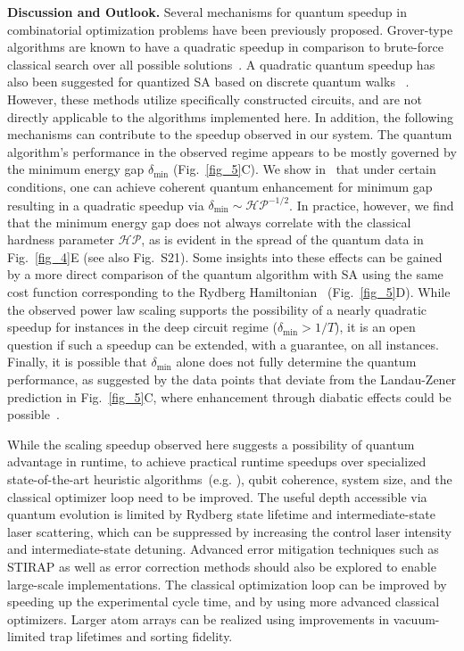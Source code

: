 \documentclass[twocolumn,amssymb,secnumarabic, prl, aps, nofootinbib]{revtex4-1}
\begin{document}
\noindent \textbf{Discussion and Outlook.}
Several mechanisms for quantum speedup in combinatorial optimization problems have been previously proposed. Grover-type algorithms are known to have a quadratic speedup in comparison to brute-force classical search over all possible solutions~\cite{grover_fast_1996, durr1999quantum}. 
A quadratic quantum speedup has also been suggested for quantized SA based on discrete quantum walks ~\cite{sze04, SBBK2008QSA}. However, these methods utilize specifically constructed circuits, and are not directly applicable to the algorithms implemented here. In addition, the following mechanisms can contribute to the speedup observed in our system. 
The quantum algorithm's performance in the observed regime appears to be mostly governed by the minimum energy gap $\delta_{\min}$ (Fig.~\ref{fig_5}C). We show in~\cite{SI} that under certain conditions, one can achieve coherent quantum enhancement for minimum gap resulting in a quadratic speedup via $\delta_{\min} \sim \mathcal{HP}^{-1/2}$. In practice, however,  we find that the minimum energy gap does not always correlate with the classical hardness parameter $\mathcal{HP}$, as is evident in the spread of the quantum data in Fig.~\ref{fig_4}E (see also Fig.~S21). Some insights into these effects can be gained by a more direct comparison of the quantum algorithm with SA using the same cost function corresponding to the Rydberg Hamiltonian~\cite{SI} (Fig.~\ref{fig_5}D). While the observed power law scaling supports the possibility of a nearly quadratic speedup for instances in the deep circuit regime ($\delta_{\min}>1/T$), it is an open question if such a speedup can be extended, with a guarantee, on all instances. Finally, it is possible that $\delta_{\min}$ alone does not fully determine the quantum performance, as suggested by the data points that deviate from the Landau-Zener prediction in Fig.~\ref{fig_5}C, where enhancement through diabatic effects could be possible~\cite{crosson2014different, zhou_quantum_2020}.


While the scaling speedup observed here suggests a possibility of quantum advantage in runtime, to achieve practical runtime speedups over specialized state-of-the-art heuristic algorithms~(e.g. \cite{redumis2}), qubit coherence, system size, and the classical optimizer loop need to be improved. 
The useful depth accessible via quantum evolution is limited by Rydberg state lifetime and intermediate-state laser scattering, which can be suppressed by increasing the control laser intensity and intermediate-state detuning. Advanced error mitigation techniques such as STIRAP \cite{StirapReview} as well as error correction methods should also be explored to enable large-scale implementations.
The classical optimization loop can be improved by speeding up the experimental cycle time, and by using more advanced classical optimizers. Larger atom arrays can be realized using improvements in vacuum-limited trap lifetimes and sorting fidelity.
\end{document}
